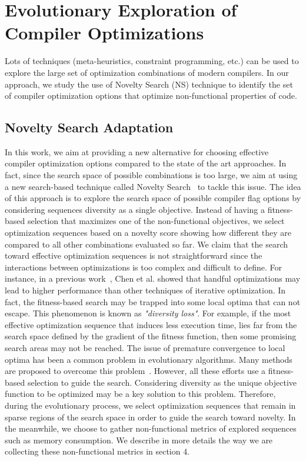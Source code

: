\section{Evolutionary Exploration of Compiler Optimizations }
 

Lots of techniques (meta-heuristics, constraint programming, etc.) can be used to explore the large set of optimization combinations of modern compilers. 
In our approach, we study the use of Novelty Search (NS) technique to identify the set of compiler optimization options that optimize non-functional properties of code.

\subsection{Novelty Search Adaptation}

In this work, we aim at providing a new alternative for choosing effective compiler optimization options compared to the state of the art approaches. 
In fact, since the search space of possible combinations is too large, we aim at using a new search-based technique called Novelty Search~\cite{lehman2008exploiting} to tackle this issue. 
The idea of this approach is to explore the search space of possible compiler flag options by considering sequences diversity as a single objective. 
Instead of having a fitness-based selection that maximizes one of the non-functional objectives, we select optimization sequences based on a novelty score showing how different they are compared to all other combinations evaluated so far. 
We claim that the search toward effective optimization sequences is not straightforward since the interactions between optimizations is too complex and difficult to define. 
For instance, in a previous work~\cite{chen2012deconstructing}, Chen et al. showed that handful optimizations may lead to higher performance than other techniques of iterative optimization. 
In fact, the fitness-based search may be trapped into some local optima that can not escape. 
This phenomenon is known as \textit{"diversity loss"}. For example, if the most effective optimization sequence that induces less execution time, lies far from the search space defined by the gradient of the fitness function, then some promising search areas may not be reached. 
The issue of premature convergence to local optima has been a common problem in evolutionary algorithms. 
Many methods are proposed to overcome this problem~\cite{banzhaf1996effect,gathercole1996adverse}. 
However, all these efforts use a fitness-based selection to guide the search. Considering diversity as the unique objective function to be optimized may be a key solution to this problem.
Therefore, during the evolutionary process, we select optimization sequences that remain in sparse regions of the search space in order to guide the search toward novelty. 
In the meanwhile, we choose to gather non-functional metrics of explored sequences such as memory consumption. 
We describe in more details the way we are collecting these non-functional metrics in section 4.

